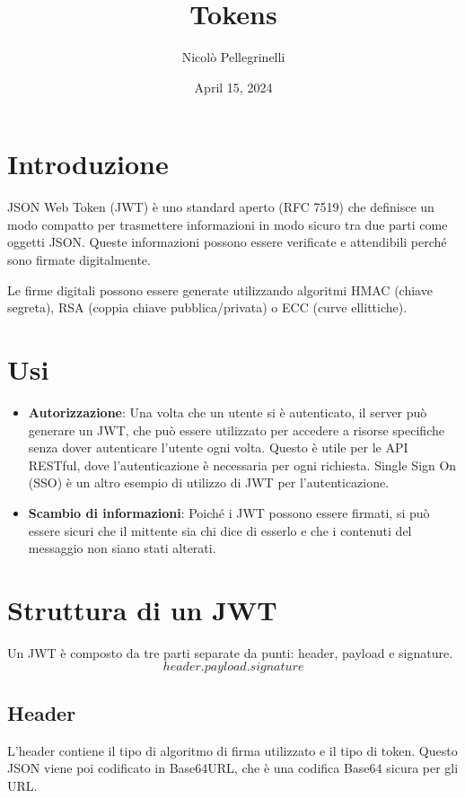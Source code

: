 \documentclass{article}
\title{Tokens}
\author{Nicolò Pellegrinelli}
\date{April 15, 2024}
\begin{document}
\sloppy

\maketitle

\section{Introduzione}
JSON Web Token (JWT) è uno standard aperto (RFC 7519) che definisce un modo compatto per trasmettere informazioni in modo sicuro tra due parti come oggetti JSON.
Queste informazioni possono essere verificate e attendibili perché sono firmate digitalmente.

Le firme digitali possono essere generate utilizzando algoritmi HMAC (chiave segreta), RSA (coppia chiave pubblica/privata) o ECC (curve ellittiche).

\section{Usi}
\begin{itemize}
	\item \textbf{Autorizzazione}: Una volta che un utente si è autenticato, il server può generare un JWT, che può essere utilizzato per accedere a risorse specifiche senza dover autenticare l'utente ogni volta.
	      Questo è utile per le API RESTful, dove l'autenticazione è necessaria per ogni richiesta.
	      Single Sign On (SSO) è un altro esempio di utilizzo di JWT per l'autenticazione.
	\item \textbf{Scambio di informazioni}: Poiché i JWT possono essere firmati, si può essere sicuri che il mittente sia chi dice di esserlo e che i contenuti del messaggio non siano stati alterati.
\end{itemize}

\section{Struttura di un JWT}
Un JWT è composto da tre parti separate da punti: header, payload e signature.
$$header.payload.signature$$

\subsection{Header}
L'header contiene il tipo di algoritmo di firma utilizzato e il tipo di token.
Questo JSON viene poi codificato in Base64URL, che è una codifica Base64 sicura per gli URL.
\end{document}
